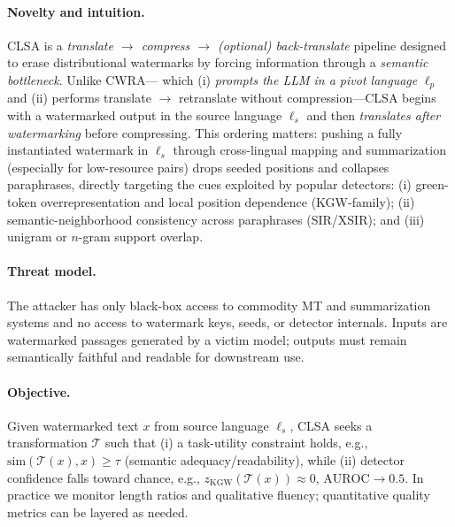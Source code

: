 \documentclass{article}
\begin{document}
\paragraph{Novelty and intuition.}
CLSA is a \emph{translate $\rightarrow$ compress $\rightarrow$ (optional) back-translate} pipeline designed to erase distributional watermarks by forcing information through a \emph{semantic bottleneck}. Unlike CWRA— which (i) \emph{prompts the LLM in a pivot language} $\ell_p$ and (ii) performs translate $\rightarrow$ retranslate without compression—CLSA begins with a watermarked output in the source language $\ell_s$ and then \emph{translates after watermarking} before compressing. This ordering matters: pushing a fully instantiated watermark in $\ell_s$ through cross-lingual mapping and summarization (especially for low-resource pairs) drops seeded positions and collapses paraphrases, directly targeting the cues exploited by popular detectors: (i) green-token overrepresentation and local position dependence (KGW-family); (ii) semantic-neighborhood consistency across paraphrases (SIR/XSIR); and (iii) unigram or $n$-gram support overlap.

\paragraph{Threat model.}
The attacker has only black-box access to commodity MT and summarization systems and no access to watermark keys, seeds, or detector internals. Inputs are watermarked passages generated by a victim model; outputs must remain semantically faithful and readable for downstream use.

\paragraph{Objective.}
Given watermarked text $x$ from source language $\ell_s$, CLSA seeks a transformation $\mathcal{T}$ such that (i) a task-utility constraint holds, e.g., $\mathrm{sim}(\mathcal{T}(x), x) \ge \tau$ (semantic adequacy/readability), while (ii) detector confidence falls toward chance, e.g., $z_{\mathrm{KGW}}(\mathcal{T}(x)) \approx 0$, $\mathrm{AUROC} \rightarrow 0.5$. In practice we monitor length ratios and qualitative fluency; quantitative quality metrics can be layered as needed.
\end{document}
